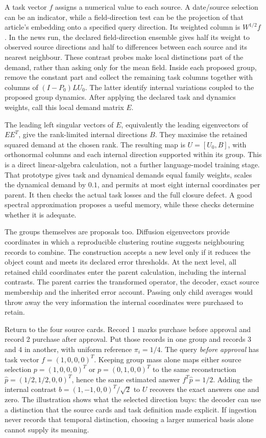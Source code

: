 A task vector $f$ assigns a numerical value to each source. A date/source selection can be an indicator, while a field-direction test can be the projection of that article's embedding onto a specified query direction. Its weighted column is $W^{1/2}f$. In the news run, the declared field-direction ensemble gives half its weight to observed source directions and half to differences between each source and its nearest neighbour. These contrast probes make local distinctions part of the demand, rather than asking only for the mean field. Inside each proposed group, remove the constant part and collect the remaining task columns together with columns of $(I-P_0)LU_0$. The latter identify internal variations coupled to the proposed group dynamics. After applying the declared task and dynamics weights, call this local demand matrix $E$.

The leading left singular vectors of $E$, equivalently the leading eigenvectors of $EE^T$, give the rank-limited internal directions $B$. They maximise the retained squared demand at the chosen rank. The resulting map is $U=[U_0,B]$, with orthonormal columns and each internal direction supported within its group. This is a direct linear-algebra calculation, not a further language-model training stage. That prototype gives task and dynamical demands equal family weights, scales the dynamical demand by $0.1$, and permits at most eight internal coordinates per parent. It then checks the actual task losses and the full closure defect. A good spectral approximation proposes a useful memory, while these checks determine whether it is adequate.

The groups themselves are proposals too. Diffusion eigenvectors provide coordinates in which a reproducible clustering routine suggests neighbouring records to combine. The construction accepts a new level only if it reduces the object count and meets its declared error thresholds. At the next level, all retained child coordinates enter the parent calculation, including the internal contrasts. The parent carries the transformed operator, the decoder, exact source membership and the inherited error account. Passing only child averages would throw away the very information the internal coordinates were purchased to retain.

Return to the four source cards. Record 1 marks purchase before approval and record 2 purchase after approval. Put those records in one group and records 3 and 4 in another, with uniform reference $\pi_i=1/4$. The query \emph{before approval} has task vector $f=(1,0,0,0)^T$. Keeping group mass alone maps either source selection $p=(1,0,0,0)^T$ or $p=(0,1,0,0)^T$ to the same reconstruction $\hat p=(1/2,1/2,0,0)^T$, hence the same estimated answer $f^T\hat p=1/2$. Adding the internal contrast $b=(1,-1,0,0)^T/\sqrt2$ to $U$ recovers the exact answers one and zero. The illustration shows what the selected direction buys: the decoder can use a distinction that the source cards and task definition made explicit. If ingestion never records that temporal distinction, choosing a larger numerical basis alone cannot supply its meaning.


